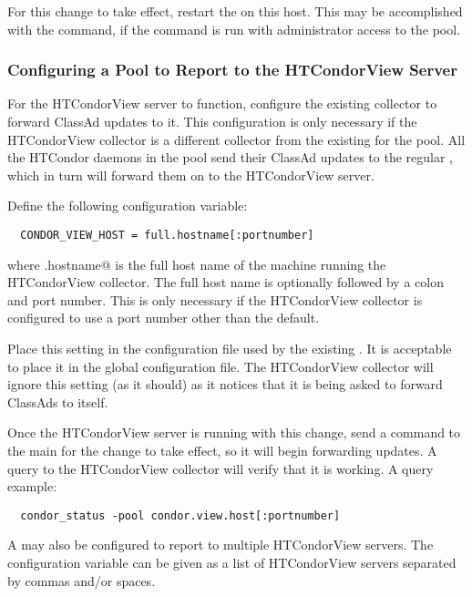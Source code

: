 For this change to take effect, restart the
 on this host.
This may be accomplished with the  command,
if the command is run with
administrator access to the pool.


\subsubsection{\label{sec:HTCondorView-Pool-Setup}
Configuring a Pool to Report to the HTCondorView Server} 

For the HTCondorView server to function, configure the existing collector to
forward ClassAd updates to it.
This configuration is only necessary if 
the HTCondorView collector is a different collector from the existing
 for the pool.
All the HTCondor daemons in the pool send their ClassAd updates to the
regular , which in turn will forward them on to the
HTCondorView server.

Define the following configuration variable:
\footnotesize
\begin{verbatim}
  CONDOR_VIEW_HOST = full.hostname[:portnumber]
\end{verbatim}
\normalsize
where \verb@full.hostname@ is the full host name of the machine 
running the HTCondorView collector.
The full host name is optionally followed by a colon and
port number.  This is only necessary if the HTCondorView
collector is configured to use a port number other than the default.

Place this setting in the configuration file used by the existing 
.
It is acceptable to place it in the global configuration file.  The
HTCondorView collector will ignore this setting (as it should) as it notices
that it is being asked to forward ClassAds to itself.

Once the HTCondorView server is running with this 
change, send a
 command to the main  for the change to
take effect, so it will begin forwarding updates.  
A query to the HTCondorView collector will verify that it is working.
A query example:

\footnotesize
\begin{verbatim}
  condor_status -pool condor.view.host[:portnumber]
\end{verbatim}
\normalsize


A  may also be configured to report to multiple HTCondorView
servers.  The configuration variable  can be
given as a list of HTCondorView servers separated by commas and/or spaces.

